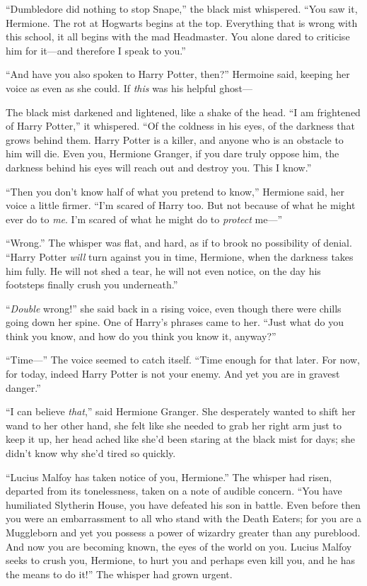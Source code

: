 “Dumbledore did nothing to stop Snape,” the black mist whispered. “You saw it,
Hermione. The rot at Hogwarts begins at the top. Everything that is wrong with
this school, it all begins with the mad Headmaster. You alone dared to criticise
him for it—and therefore I speak to you.”

“And have you also spoken to Harry Potter, then?” Hermoine said, keeping her
voice as even as she could. If \emph{this} was his helpful ghost—

The black mist darkened and lightened, like a shake of the head. “I am
frightened of Harry Potter,” it whispered. “Of the coldness in his eyes, of the
darkness that grows behind them. Harry Potter is a killer, and anyone who is an
obstacle to him will die. Even you, Hermione Granger, if you dare truly oppose
him, the darkness behind his eyes will reach out and destroy you. This I know.”

“Then you don’t know half of what you pretend to know,” Hermione said, her
voice a little firmer. “I’m scared of Harry too. But not because of what he
might ever do to \emph{me}. I’m scared of what he might do to \emph{protect}
me—”

“Wrong.” The whisper was flat, and hard, as if to brook no possibility of
denial. “Harry Potter \emph{will} turn against you in time, Hermione, when the
darkness takes him fully. He will not shed a tear, he will not even notice, on
the day his footsteps finally crush you underneath.”

“\emph{Double} wrong!” she said back in a rising voice, even though there were
chills going down her spine. One of Harry’s phrases came to her. “Just what do
you think you know, and how do you think you know it, anyway?”

“Time—” The voice seemed to catch itself. “Time enough for that later. For
now, for today, indeed Harry Potter is not your enemy. And yet you are in
gravest danger.”

“I can believe \emph{that},” said Hermione Granger. She desperately wanted to
shift her wand to her other hand, she felt like she needed to grab her right
arm just to keep it up, her head ached like she’d been staring at the black
mist for days; she didn’t know why she’d tired so quickly.

“Lucius Malfoy has taken notice of you, Hermione.” The whisper had risen,
departed from its tonelessness, taken on a note of audible concern. “You have
humiliated Slytherin House, you have defeated his son in battle. Even before
then you were an embarrassment to all who stand with the Death Eaters; for you
are a Muggleborn and yet you possess a power of wizardry greater than any
pureblood. And now you are becoming known, the eyes of the world on you. Lucius
Malfoy seeks to crush you, Hermione, to hurt you and perhaps even kill you, and
he has the means to do it!” The whisper had grown urgent.

